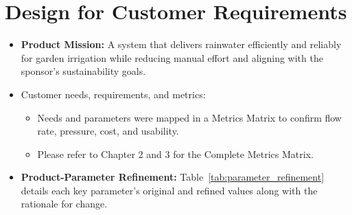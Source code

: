 \documentclass[12pt]{article}
\begin{document}
\section{Design for Customer Requirements}
\begin{itemize}[leftmargin=1.5cm]
    \item \textbf{Product Mission:}  
    A system that delivers rainwater efficiently and reliably for garden irrigation while reducing manual effort and aligning with the sponsor's sustainability goals.

    \item Customer needs, requirements, and metrics:
    \begin{itemize}
        \item Needs and parameters were mapped in a Metrics Matrix to confirm flow rate, pressure, cost, and usability.
        \item Please refer to Chapter 2 and 3 for the Complete Metrics Matrix.
    \end{itemize}


    \item \textbf{Product-Parameter Refinement:}  
    Table~\ref{tab:parameter_refinement} details each key parameter’s original and refined values along with the rationale for change.


\end{itemize}
\end{document}

